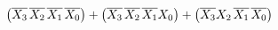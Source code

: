 \documentclass[preview]{standalone}
\begin{document}
\begin{align*}
\left(\overline{X_3}\hspace{0.05cm}\overline{X_2}\hspace{0.05cm}\overline{X_1}\hspace{0.05cm}\overline{X_0}\right)+\left(\overline{X_3}\hspace{0.05cm}\overline{X_2}\hspace{0.05cm}\overline{X_1}X_0\right)+\left(\overline{X_3}X_2\hspace{0.05cm}\overline{X_1}\hspace{0.05cm}\overline{X_0}\right)
\end{align*}
\end{document}
